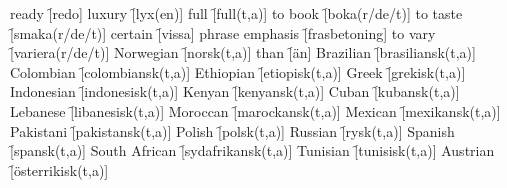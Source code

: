 \begin{questions}
\begin{multicols}{2}
        \question ready \f[redo]
        \question luxury \f[lyx(en)]
        \question full \f[full(t,a)]
        \question to book \f[boka(r/de/t)]
        \question to taste \f[smaka(r/de/t)]
        \question certain \f[vissa]
        \question phrase emphasis \f[frasbetoning]
        \question to vary \f[variera(r/de/t)]
        \question Norwegian \f[norsk(t,a)]
        \question than \f[än]
        \question Brazilian \f[brasiliansk(t,a)]
        \question Colombian \f[colombiansk(t,a)]
        \question Ethiopian \f[etiopisk(t,a)]
        \question Greek \f[grekisk(t,a)]
        \question Indonesian \f[indonesisk(t,a)]
        \question Kenyan \f[kenyansk(t,a)]
        \question Cuban \f[kubansk(t,a)]
        \question Lebanese \f[libanesisk(t,a)]
        \question Moroccan \f[marockansk(t,a)]
        \question Mexican \f[mexikansk(t,a)]
        \question Pakistani \f[pakistansk(t,a)]
        \question Polish \f[polsk(t,a)]
        \question Russian \f[rysk(t,a)]
        \question Spanish \f[spansk(t,a)]
        \question South African \f[sydafrikansk(t,a)]
        \question Tunisian \f[tunisisk(t,a)]
        \question Austrian \f[österrikisk(t,a)]
    \end{multicols}
\end{questions}
